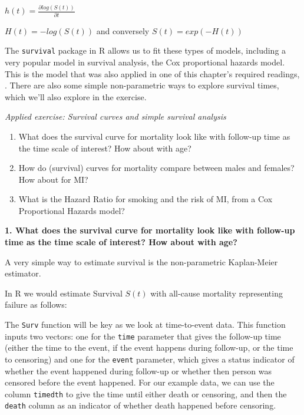 \documentclass[
]{book}
\newenvironment{Shaded}{\begin{snugshade}}{\end{snugshade}}
\newcommand{\DataTypeTok}[1]{\textcolor[rgb]{0.13,0.29,0.53}{#1}}
\newcommand{\KeywordTok}[1]{\textcolor[rgb]{0.13,0.29,0.53}{\textbf{#1}}}
\newcommand{\NormalTok}[1]{#1}
\newcommand{\OperatorTok}[1]{\textcolor[rgb]{0.81,0.36,0.00}{\textbf{#1}}}
\newcommand{\StringTok}[1]{\textcolor[rgb]{0.31,0.60,0.02}{#1}}
\providecommand{\tightlist}{%
  \setlength{\itemsep}{0pt}\setlength{\parskip}{0pt}}
\begin{document}
\(h(t)=\frac{\partial log(S(t))}{\partial t}\)

\(H(t)=-log(S(t))\) and conversely \(S(t)=exp(-H(t))\)

The \texttt{survival} package in R allows us to fit these types of models, including a very popular model in survival analysis, the Cox proportional hazards model. This is the model that was also applied in one of this chapter's required readings, \citet{wong1989risk}. There are also some simple non-parametric ways to explore survival times, which we'll also explore in the exercise.

\emph{Applied exercise: Survival curves and simple survival analysis}

\begin{enumerate}
\def\labelenumi{\arabic{enumi}.}
\tightlist
\item
  What does the survival curve for mortality look like with follow-up time as the time scale of interest? How about with age?
\item
  How do (survival) curves for mortality compare between males and females? How about for MI?
\item
  What is the Hazard Ratio for smoking and the risk of MI, from a Cox Proportional Hazards model?
\end{enumerate}

\textbf{1. What does the survival curve for mortality look like with follow-up time as the time scale of interest? How about with age?}

A very simple way to estimate survival is the non-parametric Kaplan-Meier estimator.

In R we would estimate Survival \(S(t)\) with all-cause mortality representing failure as follows:

\begin{Shaded}
\end{Shaded}

The \texttt{Surv} function will be key as we look at time-to-event data. This function inputs two vectors: one for the \texttt{time} parameter that gives the follow-up time (either the time to the event, if the event happens during follow-up, or the time to censoring) and one for the \texttt{event} parameter, which gives a status indicator of whether the event happened during follow-up or whether then person was censored before the event happened. For our example data, we can use the column \texttt{timedth} to give the time until either death or censoring, and then the \texttt{death} column as an indicator of whether death happened before censoring.
\end{document}
